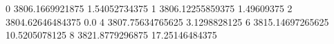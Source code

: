 0 3806.1669921875 1.54052734375
1 3806.12255859375 1.49609375
2 3804.62646484375 0.0
4 3807.75634765625 3.1298828125
6 3815.14697265625 10.5205078125
8 3821.8779296875 17.25146484375

